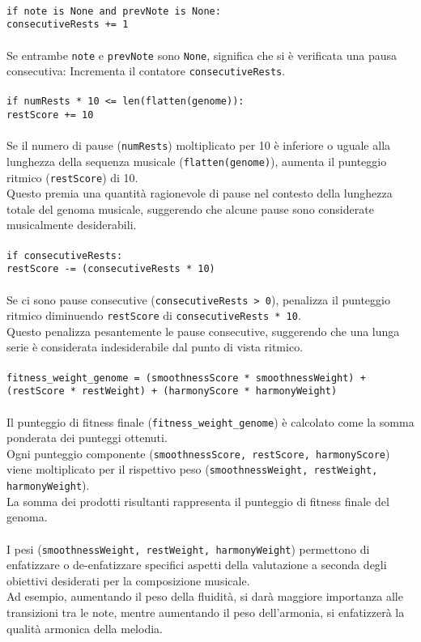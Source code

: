 \documentclass[a4paper,12pt]{report}
\begin{document}
\\
\texttt{\small if note is None and prevNote is None:} \\
\indent \texttt{\small consecutiveRests += 1} \\
\\
Se entrambe \texttt{note} e \texttt{prevNote} sono \texttt{None}, significa che si è verificata una pausa consecutiva: Incrementa il contatore \texttt{consecutiveRests}. \\
\\
\texttt{\small if numRests * 10 <= len(flatten(genome)):} \\
\indent \texttt{\small restScore += 10} \\
\\
Se il numero di pause (\texttt{numRests}) moltiplicato per 10 è inferiore o uguale alla lunghezza della sequenza musicale (\texttt{flatten(genome)}), aumenta il punteggio ritmico (\texttt{restScore}) di 10. \\
Questo premia una quantità ragionevole di pause nel contesto della lunghezza totale del genoma musicale, suggerendo che alcune pause sono considerate musicalmente desiderabili. \\
\\
\texttt{\small if consecutiveRests:} \\
\indent \texttt{\small restScore -= (consecutiveRests * 10)} \\
\\
Se ci sono pause consecutive (\texttt{consecutiveRests > 0}), penalizza il punteggio ritmico diminuendo \texttt{restScore} di \texttt{consecutiveRests * 10}. \\
Questo penalizza pesantemente le pause consecutive, suggerendo che una lunga serie è considerata indesiderabile dal punto di vista ritmico. \\
\\
\texttt{\small fitness\_weight\_genome = (smoothnessScore * smoothnessWeight) + (restScore * restWeight) + (harmonyScore * harmonyWeight)} \\
\\
Il punteggio di fitness finale (\texttt{fitness\_weight\_genome}) è calcolato come la somma ponderata dei punteggi ottenuti. \\
Ogni punteggio componente (\texttt{smoothnessScore, restScore, harmonyScore}) viene moltiplicato per il rispettivo peso (\texttt{smoothnessWeight, restWeight, harmonyWeight}). \\
La somma dei prodotti risultanti rappresenta il punteggio di fitness finale del genoma. \\
\\
I pesi (\texttt{smoothnessWeight, restWeight, harmonyWeight}) permettono di enfatizzare o de-enfatizzare specifici aspetti della valutazione a seconda degli obiettivi desiderati per la composizione musicale. \\
Ad esempio, aumentando il peso della fluidità, si darà maggiore importanza alle transizioni tra le note, mentre aumentando il peso dell'armonia, si enfatizzerà la qualità armonica della melodia. 
\end{document}
